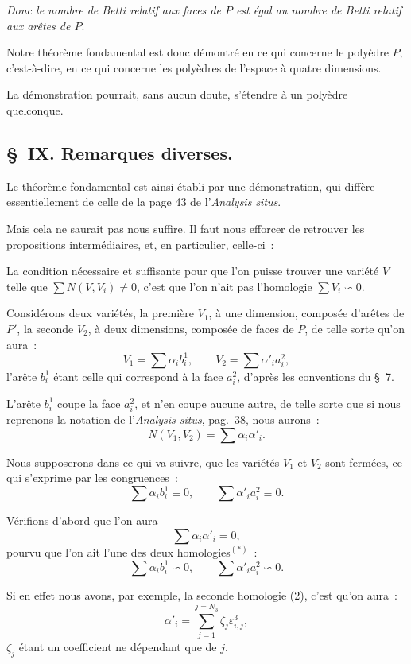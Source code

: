 \documentclass{article}
\begin{document}
\emph{Donc le nombre de Betti relatif aux faces de $P$ est égal au nombre de Betti relatif aux arêtes de $P$}.

Notre théorème fondamental est donc démontré en ce qui concerne le polyèdre $P$, c'est-à-dire, en ce qui concerne les polyèdres de l'espace à quatre dimensions.

La démonstration pourrait, sans aucun doute, s'étendre à un polyèdre quelconque.

\subsection*{\S~IX. Remarques diverses.}

Le théorème fondamental est ainsi établi par une démonstration, qui diffère essentiellement de celle de la page 43 de l'\emph{Analysis situs}.

Mais cela ne saurait pas nous suffire. Il faut nous efforcer de retrouver les propositions intermédiaires, et, en particulier, celle-ci~:

La condition nécessaire et suffisante pour que l'on puisse trouver une variété $V$ telle que $\displaystyle\sum N(V, V_{i}) \neq 0$, c'est que l'on n'ait pas l'homologie $\displaystyle\sum V_{i} \backsim 0$.

Considérons deux variétés, la première $V_{1}$, à une dimension, composée d'arêtes de $P'$, la seconde $V_{2}$, à deux dimensions, composée de faces de $P$, de telle sorte qu'on aura~:
\[ V_{1} = \sum \alpha_{i} b^{1}_{i}, \qquad V_{2} = \sum \alpha'_{i} a^{2}_{i}, \]
l'arête $b^{1}_{i}$ étant celle qui correspond à la face $a^{2}_{i}$, d'après les conventions du \S~7.

L'arête $b^{1}_{i}$ coupe la face $a^{2}_{i}$, et n'en coupe aucune autre, de telle sorte que si nous reprenons la notation de l'\emph{Analysis situs}, pag.\ 38, nous aurons~:
\[ N(V_{1}, V_{2}) = \sum \alpha_{i} \alpha'_{i}. \]

Nous supposerons dans ce qui va suivre, que les variétés $V_{1}$ et
$V_{2}$ sont fermées, ce qui s'exprime par les congruences~:
\[ \sum \alpha_{i} b^{1}_{i} \equiv 0, \qquad \sum \alpha'_{i} a^{2}_{i} \equiv 0. \tag{1} \]

Vérifions d'abord que l'on aura
\[ \sum \alpha_{i} \alpha'_{i} = 0, \]
pourvu que l'on ait l'une des deux homologies${}^{(*)}$~:
\[ \sum \alpha_{i} b^{1}_{i} \backsim 0, \qquad \sum \alpha'_{i} a^{2}_{i} \backsim 0. \tag{2} \]

Si en effet nous avons, par exemple, la seconde homologie (2), c'est qu'on aura~:
\[ \alpha'_{i} = \sum_{j=1}^{j=N_{3}} \zeta_{j} \varepsilon^{3}_{i,j}, \]
$\zeta_{j}$ étant un coefficient ne dépendant que de $j$.
\end{document}
